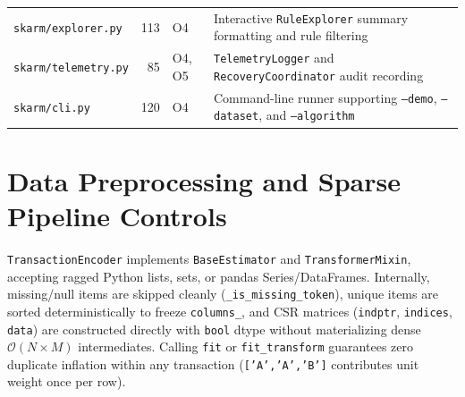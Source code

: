 \begin{table}[ht!]
{\begin{tabular}{@{}L{0.28\textwidth}rL{0.10\textwidth}L{0.48\textwidth}@{}}
\addlinespace[1.2pt]
\texttt{skarm/\protect\allowbreak{}explorer.py} & 113 & O4 & Interactive \texttt{RuleExplorer} summary formatting and rule filtering \\
\addlinespace[1.2pt]
\texttt{skarm/\protect\allowbreak{}telemetry.py} & 85 & O4, O5 & \texttt{TelemetryLogger} and \texttt{RecoveryCoordinator} audit recording \\
\addlinespace[1.2pt]
\texttt{skarm/\protect\allowbreak{}cli.py} & 120 & O4 & Command-line runner supporting \texttt{--demo}, \texttt{--dataset}, and \texttt{--algorithm} \\
\bottomrule\end{tabular}}
\end{table}

\section{Data Preprocessing and Sparse Pipeline Controls}
\texttt{TransactionEncoder} implements \texttt{BaseEstimator} and \texttt{TransformerMixin}, accepting ragged Python lists, sets, or pandas Series/DataFrames. Internally, missing/null items are skipped cleanly (\texttt{\_\protect\allowbreak{}is\_\protect\allowbreak{}missing\_\protect\allowbreak{}token}), unique items are sorted deterministically to freeze \texttt{columns\_\protect\allowbreak{}}, and CSR matrices (\texttt{indptr}, \texttt{indices}, \texttt{data}) are constructed directly with \texttt{bool} dtype without materializing dense $\mathcal{O}(N \times M)$ intermediates. Calling \texttt{fit} or \texttt{fit\_\protect\allowbreak{}transform} guarantees zero duplicate inflation within any transaction (\texttt{['A','A','B']} contributes unit weight once per row).

